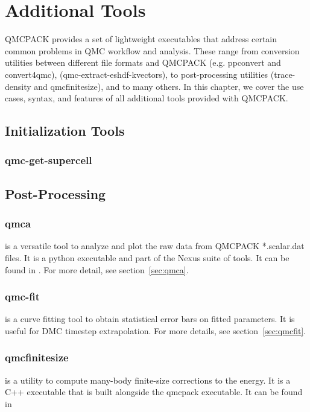 \chapter{Additional Tools}
\label{chap:additional_tools}
QMCPACK provides a set of lightweight executables that address certain
common problems in QMC workflow and analysis.  These range from conversion utilities between 
different file formats and QMCPACK (e.g. ppconvert and convert4qmc),  
(qmc-extract-eshdf-kvectors), to post-processing utilities (trace-density and qmcfinitesize), and to many others.  In this chapter, we cover the use cases, syntax, and features of all additional tools provided with QMCPACK.  

\section{Initialization Tools}
  \subsection{qmc-get-supercell}

\section{Post-Processing}
  \subsection{qmca}
     is a versatile tool to analyze and plot the raw data from QMCPACK *.scalar.dat files.
    It is a python executable and part of the Nexus suite of tools.  It can be found in 
    . For more detail, see section~\ref{sec:qmca}.
  \subsection{qmc-fit}
     is a curve fitting tool to obtain statistical error bars on fitted parameters.
    It is useful for DMC timestep extrapolation.  For more details, see section~\ref{sec:qmcfit}.
  \subsection{qmcfinitesize}
     is a utility to compute many-body finite-size corrections to the energy.  It
    is a C++ executable that is built alongside the qmcpack executable.  It can be found in 

